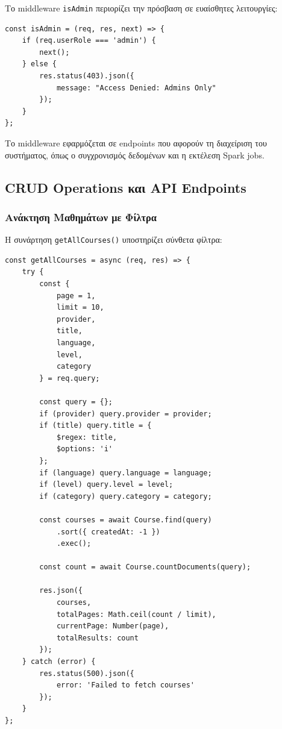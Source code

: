 \documentclass[a4paper,12pt]{article}
\begin{document}
Το middleware \texttt{isAdmin} περιορίζει την πρόσβαση σε ευαίσθητες λειτουργίες:

\begin{verbatim}
const isAdmin = (req, res, next) => {
    if (req.userRole === 'admin') {
        next();
    } else {
        res.status(403).json({ 
            message: "Access Denied: Admins Only" 
        });
    }
};
\end{verbatim}

Το middleware εφαρμόζεται σε endpoints που αφορούν τη διαχείριση του συστήματος, όπως ο συγχρονισμός δεδομένων και η εκτέλεση Spark jobs.

\subsection{CRUD Operations και API Endpoints}

\subsubsection{Ανάκτηση Μαθημάτων με Φίλτρα}

Η συνάρτηση \texttt{getAllCourses()} υποστηρίζει σύνθετα φίλτρα:

\begin{verbatim}
const getAllCourses = async (req, res) => {
    try {
        const { 
            page = 1, 
            limit = 10, 
            provider, 
            title, 
            language, 
            level, 
            category 
        } = req.query;

        const query = {};
        if (provider) query.provider = provider;
        if (title) query.title = { 
            $regex: title, 
            $options: 'i' 
        };
        if (language) query.language = language;
        if (level) query.level = level;
        if (category) query.category = category;

        const courses = await Course.find(query)
            .sort({ createdAt: -1 })
            .exec();

        const count = await Course.countDocuments(query);

        res.json({
            courses,
            totalPages: Math.ceil(count / limit),
            currentPage: Number(page),
            totalResults: count
        });
    } catch (error) {
        res.status(500).json({ 
            error: 'Failed to fetch courses' 
        });
    }
};
\end{verbatim}
\end{document}

